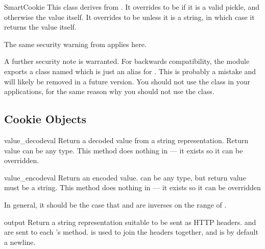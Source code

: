 \begin{classdesc}{SmartCookie}{}
This class derives from . It overrides
 to be  if it is a
valid pickle, and otherwise the value itself. It overrides
 to be  unless it is a
string, in which case it returns the value itself.

 The same security warning from 
applies here.
\end{classdesc}

A further security note is warranted.  For backwards compatibility,
the  module exports a class named  which
is just an alias for .  This is probably a mistake
and will likely be removed in a future version.  You should not use
the  class in your applications, for the same reason why
you should not use the  class.


\begin{seealso}
\end{seealso}


\subsection{Cookie Objects \label{cookie-objects}}

\begin{methoddesc}[BaseCookie]{value_decode}{val}
Return a decoded value from a string representation. Return value can
be any type. This method does nothing in  --- it exists
so it can be overridden.
\end{methoddesc}

\begin{methoddesc}[BaseCookie]{value_encode}{val}
Return an encoded value.  can be any type, but return value
must be a string. This method does nothing in  --- it exists
so it can be overridden

In general, it should be the case that  and 
 are inverses on the range of .
\end{methoddesc}

\begin{methoddesc}[BaseCookie]{output}{}
Return a string representation suitable to be sent as HTTP headers.
 and  are sent to each 's
 method.  is used to join the headers
together, and is by default a newline.
\end{methoddesc}

